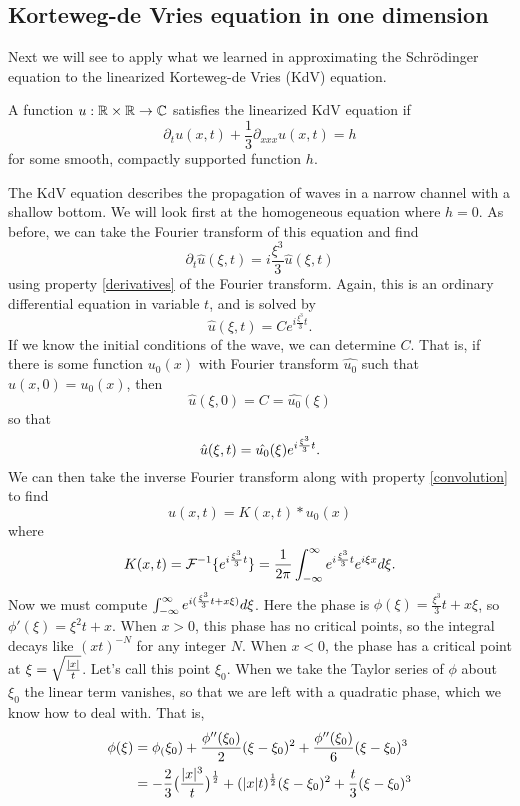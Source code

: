 \subsection{Korteweg-de Vries equation in one dimension}
Next we will see to apply what we learned in approximating the Schr{\"o}dinger equation to the linearized Korteweg-de Vries (KdV) equation. 
\begin{definition}
	A function $u: \mathbb{R} \times \mathbb{R} \to \mathbb{C}$ satisfies the linearized KdV equation if
	\[
		\partial_tu(x, t) + \frac{1}{3}\partial_{xxx}u(x, t) = h
	\]
	for some smooth, compactly supported function $h$.
\end{definition}
The KdV equation describes the propagation of waves in a narrow channel with a shallow bottom.
We will look first at the homogeneous equation where $h = 0$. As before, we can take the Fourier transform of this equation and find
\[
	\partial_t \hat{u}(\xi, t) = i\frac{\xi^3}{3} \hat{u}(\xi, t)
\]
using property \ref{derivatives} of the Fourier transform. Again, this is an ordinary differential equation in variable $t$, and is solved by
\[
	\hat{u}(\xi, t) = Ce^{i\frac{\xi^3}{3} t}.
\]
If we know the initial conditions of the wave, we can determine $C$. That is, if there is some function $u_0(x)$ with Fourier transform $\hat{u_0}$ such that $u(x, 0) = u_0(x)$, then
\[
	\hat{u}(\xi, 0) = C = \hat{u_0}(\xi)
\]
so that
\begin{equation}
\notag	\hat{u}(\xi, t) = \hat{u_0}(\xi)e^{i\frac{\xi^3}{3} t}.
\end{equation}
We can then take the inverse Fourier transform along with property \ref{convolution} to find
\[
	u(x, t) = K(x, t) \ast u_0(x)
\]
where
\[
	K(x, t) = \mathcal{F}^{-1}\{e^{i\frac{\xi^3}{3} t}\} = \frac{1}{2\pi}\int_{-\infty}^\infty e^{i\frac{\xi^3}{3} t}e^{i\xi x}d\xi.
\]
Now we must compute $\int_{-\infty}^\infty e^{i(\frac{\xi^3}{3}t + x\xi)}d\xi$. Here the phase is $\phi(\xi) = \frac{\xi^3}{3}t + x\xi$, so $\phi'(\xi) = \xi^2t + x$. When $x >0$, this phase has no critical points, so the integral decays like $(xt)^{-N}$ for any integer $N$.
When $x < 0$, the phase has a critical point at $\xi = \sqrt{\frac{\lvert x\rvert}{t}}$. Let's call this point $\xi_0$.
When we take the Taylor series of $\phi$ about $\xi_0$ the linear term vanishes, so that we are left with a quadratic phase, which we know how to deal with. That is,
\begin{align}
\phi(\xi) &= \phi_(\xi_0) + \frac{\phi''(\xi_0)}{2}(\xi - \xi_0)^2 + \frac{\phi''(\xi_0)}{6}(\xi - \xi_0)^3 \notag\\
	&= -\frac{2}{3}\big(\frac{\lvert x\rvert^3}{t}\big)^\frac{1}{2} + (\lvert x\rvert t)^\frac{1}{2}(\xi-\xi_0)^2 + \frac{t}{3}(\xi-\xi_0)^3 \notag
\end{align}

